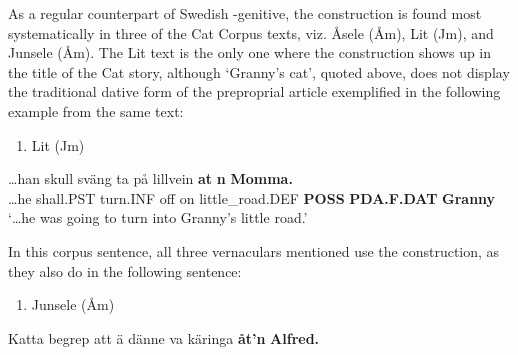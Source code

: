 As a regular counterpart of Swedish -genitive, the  construction is\textit{ }found most systematically in three of the Cat Corpus texts, viz. Åsele (Åm), Lit (Jm), and Junsele (Åm). The Lit text is the only one where the  construction shows up in the title of the Cat story, although ‘Granny’s cat’, quoted above, does not display the traditional dative form  of the preproprial article exemplified in the following example from the same text:

\begin{enumerate} %
\item 
Lit (Jm)

\end{enumerate} %
\ea\label{}
\gll …han  skull  sväng  ta  på  lillvein  \textbf{at} \textbf{n} \textbf{Momma.}\\


…he  shall.PST  turn.INF  off  on  little\_road.DEF  \textbf{POSS} \textbf{PDA.F.DAT} \textbf{Granny}\\ %


‘…he was going to turn into Granny’s little road.’
\z


In this corpus sentence, all three vernaculars mentioned use the  construction, as they also do in the following sentence:

\begin{enumerate} %
\item 
\label{bkm:Ref137369876}Junsele (Åm)

\end{enumerate} %
\ea\label{}
\gll Katta  begrep  att  ä  dänne  va  käringa  \textbf{åt’n} \textbf{Alfred.}\\


